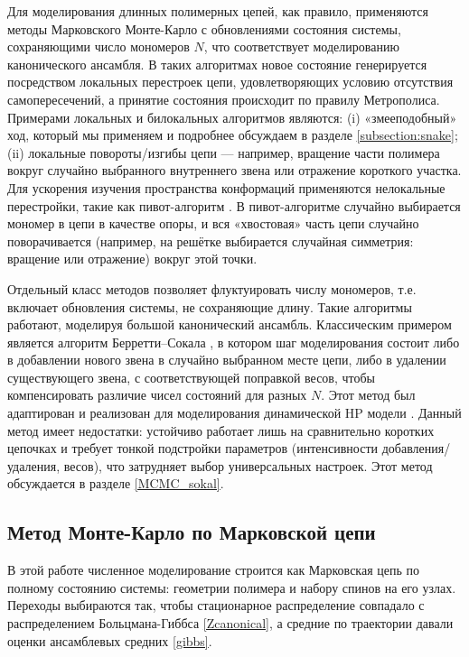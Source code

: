 
 
 Для моделирования длинных полимерных цепей, как правило, применяются методы Марковского Монте-Карло с обновлениями состояния системы, сохраняющими число мономеров $N$, что соответствует моделированию канонического ансамбля. 
 В таких алгоритмах новое состояние генерируется посредством локальных перестроек цепи, удовлетворяющих условию отсутствия самопересечений, а принятие состояния происходит по  правилу Метрополиса.
  Примерами локальных и билокальных алгоритмов являются: (i) «змееподобный» ход, который мы применяем и подробнее обсуждаем в разделе \ref{subsection:snake}; 
 (ii) локальные повороты/изгибы цепи --- например, вращение части полимера вокруг случайно выбранного внутреннего звена или отражение короткого участка. 
  Для ускорения изучения пространства конформаций применяются нелокальные перестройки, такие как пивот-алгоритм \cite{madrasokal} . 
  В пивот-алгоритме случайно выбирается мономер в цепи в качестве опоры, и вся «хвостовая» часть цепи случайно поворачивается (например, на решётке выбирается случайная симметрия: вращение или отражение) вокруг этой точки. 
 
 
 Отдельный класс методов позволяет флуктуировать числу мономеров, т.е. включает обновления системы, не сохраняющие длину. 
 Такие алгоритмы работают, моделируя большой канонический ансамбль.
 Классическим примером является алгоритм Берретти–Сокала \cite{BerettiSokal}, в котором шаг моделирования состоит либо в добавлении нового звена в случайно выбранном месте цепи, либо в удалении существующего звена, с соответствующей поправкой весов, чтобы компенсировать различие чисел состояний для разных $N$. 
 Этот метод был адаптирован и реализован для моделирования динамической HP модели \cite{faizullina2021globule1}. Данный метод имеет недостатки: устойчиво работает лишь на сравнительно коротких цепочках и требует тонкой подстройки параметров (интенсивности добавления/удаления, весов), что затрудняет выбор универсальных настроек. Этот метод обсуждается в разделе \ref{MCMC_sokal}. 
 
 
 \subsection{ Метод Монте-Карло по Марковской цепи }
  \label{MCMC_description_general}
 
В этой работе численное моделирование строится как Марковская цепь по полному состоянию системы: геометрии полимера и набору спинов на его узлах. 
Переходы выбираются так, чтобы стационарное распределение совпадало с распределением Больцмана-Гиббса \eqref{Zcanonical}, а средние по траектории давали оценки ансамблевых средних \eqref{gibbs}.

